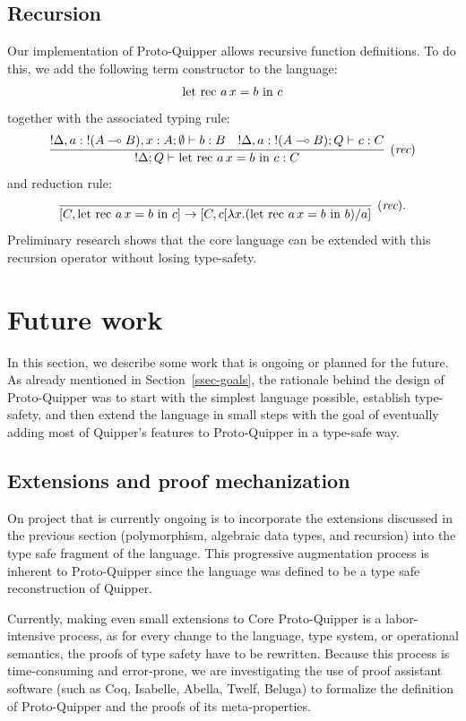 \documentclass[twoside]{article}
\begin{document}
\subsection{Recursion}

Our implementation of Proto-Quipper allows recursive function
definitions. To do this, we add the following term constructor to the
language:
\[
\textrm{\rm let rec}~ a\,x = b ~\textrm{\rm in}~ c
\]    
together with the associated typing rule:
\[
\infer[(\rul{rec})]{{!}\Delta;Q \entails \letrecin{a\,x}{b}{c}:C}{
  {!}\Delta,a:{!}(A\loli B), x:A;\emptyset \entails b:B
  &
  {!}\Delta, a:{!}(A\loli B) ;Q \entails c:C      
}
\]
and reduction rule:
\[
\infer[(\rul{rec}).]{[C,\letrecin{a\,x}{b}{c}]\to [C, c[\lambda x.(\letrecin{a\,x}{b}{b})/a]}{}
\]
Preliminary research shows that the core language can be extended 
with this recursion operator without losing type-safety. 

\clearpage
\section{Future work}\label{sec-future}

In this section, we describe some work that is ongoing or planned for
the future. As already mentioned in Section~\ref{ssec-goals}, the
rationale behind the design of Proto-Quipper was to start with the
simplest language possible, establish type-safety, and then extend the
language in small steps with the goal of eventually adding most of
Quipper's features to Proto-Quipper in a type-safe way. 

\subsection{Extensions and proof mechanization}

On project that is currently ongoing is to incorporate the extensions
discussed in the previous section (polymorphism, algebraic data types,
and recursion) into the type safe fragment of the language. This
progressive augmentation process is inherent to Proto-Quipper since
the language was defined to be a type safe reconstruction of
Quipper. 

Currently, making even small extensions to Core Proto-Quipper is a
labor-intensive process, as for every change to the language, type
system, or operational semantics, the proofs of type safety have to be
rewritten. Because this process is time-consuming and error-prone, we
are investigating the use of proof assistant software (such as Coq,
Isabelle, Abella, Twelf, Beluga) to formalize the definition of
Proto-Quipper and the proofs of its meta-properties.
\end{document}
